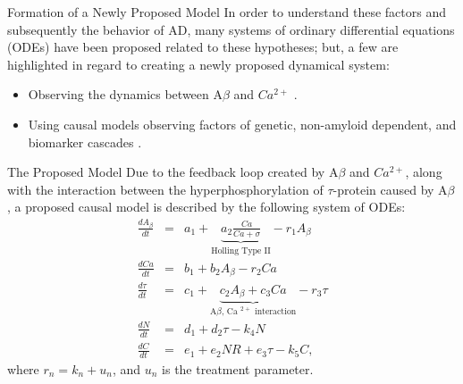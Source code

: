 \documentclass[9pt, dvipsnames,compress,aspectratio=169]{beamer}
\begin{document}
\begin{frame}{Formation of a Newly Proposed Model}
    In order to understand these factors and subsequently the behavior of AD, many systems of ordinary differential equations (ODEs) have been proposed related to these hypotheses; but, a few are highlighted in regard to creating a newly proposed dynamical system:
    \begin{itemize}
        \item Observing the dynamics between A$\beta$ and $Ca ^{2+}$ \cite{pal2025nonequilibrium}.
        \item Using causal models observing factors of genetic, non-amyloid dependent, and biomarker cascades \cite{petrella2019computational}.
    \end{itemize}
\end{frame}

\begin{frame}{The Proposed Model}
    Due to the feedback loop created by A$\beta$ and $Ca ^{2+}$, along with the interaction between the hyperphosphorylation of $\tau$-protein caused by A$\beta$, a proposed causal model is described by the following system of ODEs:
    \begin{eqnarray}
        \frac{dA _{\beta}}{dt}&=&a _{1}+\underbrace{a _{2}\frac{Ca}{Ca+\sigma}}_{\text{Holling Type II}}-r _{1}A _{\beta}\\
        \frac{dCa}{dt}&=& b _{1}+b _{2}A _{\beta}-r _{2}Ca\\
        \frac{d \tau}{dt}&=&c _{1}+\underbrace{c _{2}A _{\beta}+c _{3}Ca}_{\text{A$\beta$, Ca $^{2+}$ interaction}}-r _{3}\tau\\
        \frac{dN}{dt}&=&d _{1}+d _{2}\tau-k _{4}N\\
        \frac{dC}{dt}&=&e _{1}+e _{2}NR + e _{3}\tau - k_5 C,
    \end{eqnarray}
    where $r _{n} = k_n + u_n$, and $u_n$ is the treatment parameter.
\end{frame}
\end{document}
